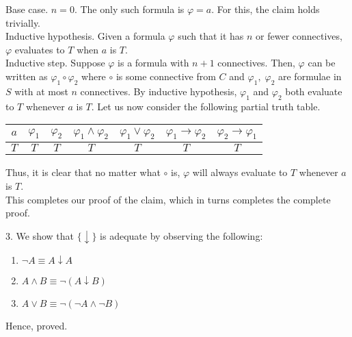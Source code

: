 \documentclass{article}
\begin{document}
Base case. $n = 0.$ The only such formula is $\varphi = a.$ For this, the claim holds trivially.\\
Inductive hypothesis. Given a formula $\varphi$ such that it has $n$ or fewer connectives, $\varphi$ evaluates to $T$ when $a$ is $T.$\\
Inductive step. Suppose $\varphi$ is a formula with $n+1$ connectives. Then, $\varphi$ can be written as $\varphi_1 \circ \varphi_2$ where $\circ$ is some connective from $C$ and $\varphi_1,\;\varphi_2$ are formulae in $S$ with at most $n$ connectives. By inductive hypothesis, $\varphi_1$ and $\varphi_2$ both evaluate to $T$ whenever $a$ is $T.$ Let us now consider the following partial truth table.\\
\begin{center}

\begin{tabular}{|c|c|c|c|c|c|c|}
	\hline
	$a$ & $\varphi_1$ & $\varphi_2$ & $\varphi_1 \wedge \varphi_2$ & $\varphi_1 \vee \varphi_2$ & $\varphi_1 \to \varphi_2$ & $\varphi_2 \to \varphi_1$ \\
	\hline
	$T$ & $T$ & $T$ & $T$ & $T$ & $T$ & $T$ \\
	\hline
\end{tabular}

\end{center}

Thus, it is clear that no matter what $\circ$ is, $\varphi$ will always evaluate to $T$ whenever $a$ is $T.$\\
This completes our proof of the claim, which in turns completes the complete proof.

\hrulefill
\newpage

3. We show that $\{\downarrow\}$ is adequate by observing the following:
\begin{enumerate}[nosep] 
	\item $\neg A \equiv A\downarrow A$
	\item $A \wedge B \equiv \neg(A \downarrow B)$
	\item $A \vee B \equiv \neg(\neg A \wedge \neg B)$
\end{enumerate}
Hence, proved.

\hrulefill
\end{document}
